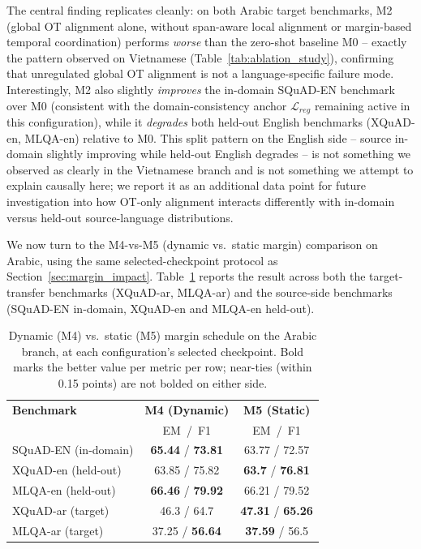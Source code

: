 \documentclass[11pt]{article}
\begin{document}
The central finding replicates cleanly: on both Arabic target benchmarks, M2 (global OT alignment alone, without span-aware local alignment or margin-based temporal coordination) performs \emph{worse} than the zero-shot baseline M0 -- exactly the pattern observed on Vietnamese (Table~\ref{tab:ablation_study}), confirming that unregulated global OT alignment is not a language-specific failure mode. Interestingly, M2 also slightly \emph{improves} the in-domain SQuAD-EN benchmark over M0 (consistent with the domain-consistency anchor $\mathcal{L}_{reg}$ remaining active in this configuration), while it \emph{degrades} both held-out English benchmarks (XQuAD-en, MLQA-en) relative to M0. This split pattern on the English side -- source in-domain slightly improving while held-out English degrades -- is not something we observed as clearly in the Vietnamese branch and is not something we attempt to explain causally here; we report it as an additional data point for future investigation into how OT-only alignment interacts differently with in-domain versus held-out source-language distributions.

We now turn to the M4-vs-M5 (dynamic vs.\ static margin) comparison on Arabic, using the same selected-checkpoint protocol as Section~\ref{sec:margin_impact}. Table~\ref{tab:arabic_margin} reports the result across both the target-transfer benchmarks (XQuAD-ar, MLQA-ar) and the source-side benchmarks (SQuAD-EN in-domain, XQuAD-en and MLQA-en held-out).

\begin{table}[H]
\centering
\small
\begin{tabular}{lcc}
\toprule
\textbf{Benchmark} & \textbf{M4 (Dynamic)} & \textbf{M5 (Static)} \\
 & EM~/~F1 & EM~/~F1 \\
\midrule
SQuAD-EN (in-domain) & \textbf{65.44} / \textbf{73.81} & 63.77 / 72.57 \\
XQuAD-en (held-out) & 63.85 / 75.82 & \textbf{63.7} / \textbf{76.81} \\
MLQA-en (held-out) & \textbf{66.46} / \textbf{79.92} & 66.21 / 79.52 \\
\midrule
XQuAD-ar (target) & 46.3 / 64.7 & \textbf{47.31} / \textbf{65.26} \\
MLQA-ar (target) & 37.25 / \textbf{56.64} & \textbf{37.59} / 56.5 \\
\bottomrule
\end{tabular}
\caption{Dynamic (M4) vs.\ static (M5) margin schedule on the Arabic branch, at each configuration's selected checkpoint. Bold marks the better value per metric per row; near-ties (within 0.15 points) are not bolded on either side.}
\label{tab:arabic_margin}
\end{table}
\end{document}
